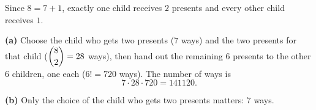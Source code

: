 Since $8=7+1$, exactly one child receives $2$ presents and every other child receives $1$.

\textbf{(a)} Choose the child who gets two presents ($7$ ways) and the two presents for that child ($\dbinom82=28$ ways), then hand out the remaining $6$ presents to the other $6$ children, one each ($6!=720$ ways). The number of ways is
\[7\cdot28\cdot720=\boxed{141120}.\]

\textbf{(b)} Only the choice of the child who gets two presents matters: $\boxed{7}$ ways.
